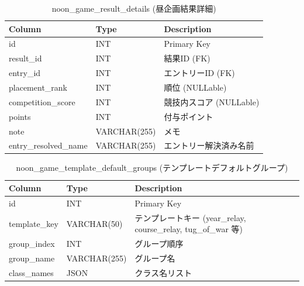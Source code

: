 \documentclass[paper=a4, fontsize=11pt]{jlreq}
\begin{document}
\begin{table}[H]
    \centering
    \caption{noon\_game\_result\_details (昼企画結果詳細)}
    \begin{tabularx}{\textwidth}{|l|l|X|}
        \toprule
        Column & Type & Description \\
        \midrule
        id & INT & Primary Key \\
        result\_id & INT & 結果ID (FK) \\
        entry\_id & INT & エントリーID (FK) \\
        placement\_rank & INT & 順位 (NULLable) \\
        competition\_score & INT & 競技内スコア (NULLable) \\
        points & INT & 付与ポイント \\
        note & VARCHAR(255) & メモ \\
        entry\_resolved\_name & VARCHAR(255) & エントリー解決済み名前 \\
        \bottomrule
    \end{tabularx}
\end{table}

\begin{table}[H]
    \centering
    \caption{noon\_game\_template\_default\_groups (テンプレートデフォルトグループ)}
    \begin{tabularx}{\textwidth}{|l|l|X|}
        \toprule
        Column & Type & Description \\
        \midrule
        id & INT & Primary Key \\
        template\_key & VARCHAR(50) & テンプレートキー (year\_relay, course\_relay, tug\_of\_war 等) \\
        group\_index & INT & グループ順序 \\
        group\_name & VARCHAR(255) & グループ名 \\
        class\_names & JSON & クラス名リスト \\
        \bottomrule
    \end{tabularx}
\end{table}
\end{document}
